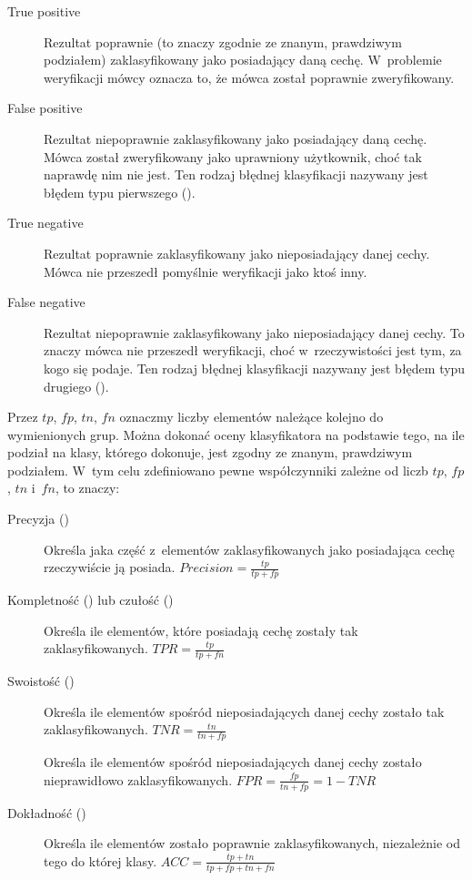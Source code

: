 \begin{description}
    \item[True positive] Rezultat poprawnie (to znaczy zgodnie ze znanym, prawdziwym podziałem) zaklasyfikowany
        jako posiadający daną cechę. W~problemie weryfikacji mówcy oznacza to, że mówca został poprawnie zweryfikowany.
    \item[False positive] Rezultat niepoprawnie zaklasyfikowany jako posiadający daną cechę. Mówca został zweryfikowany
        jako uprawniony użytkownik, choć tak naprawdę nim nie jest. Ten rodzaj błędnej klasyfikacji nazywany jest
        błędem typu pierwszego ().
    \item[True negative] Rezultat poprawnie zaklasyfikowany jako nieposiadający danej cechy. Mówca nie przeszedł pomyślnie
        weryfikacji jako ktoś inny.
    \item[False negative] Rezultat niepoprawnie zaklasyfikowany jako nieposiadający danej cechy. To znaczy mówca nie
        przeszedł weryfikacji, choć w~rzeczywistości jest tym, za kogo się podaje. Ten rodzaj błędnej klasyfikacji nazywany
        jest błędem typu drugiego ().
\end{description}

Przez $tp$, $fp$, $tn$, $fn$ oznaczmy liczby elementów należące kolejno do wymienionych grup.
Można dokonać oceny klasyfikatora na podstawie tego, na ile podział na klasy, którego dokonuje,
jest zgodny ze znanym, prawdziwym podziałem. W~tym celu zdefiniowano pewne współczynniki zależne
od liczb $tp$, $fp$, $tn$ i~$fn$, to znaczy:

\begin{description}
    \item[Precyzja ()] Określa jaka część z~elementów zaklasyfikowanych jako posiadająca cechę rzeczywiście ją posiada. $\mathit{Precision} = \frac{tp}{tp + fp}$
    \item[Kompletność () lub czułość ()]
        Określa ile elementów, które posiadają cechę zostały tak zaklasyfikowanych. $\mathit{TPR} = \frac{tp}{tp + fn}$
    \item[Swoistość ()] Określa ile elementów spośród
        nieposiadających danej cechy zostało tak zaklasyfikowanych. $\mathit{TNR} = \frac{tn}{tn + fp}$
    \item[] Określa ile elementów spośród
        nieposiadających danej cechy zostało nieprawidłowo zaklasyfikowanych. $\mathit{FPR} = \frac{fp}{tn + fp} = 1 - \mathit{TNR}$
    \item[Dokładność ()] Określa ile elementów zostało poprawnie zaklasyfikowanych,
        niezależnie od tego do której klasy. $\mathit{ACC} = \frac{tp + tn}{tp + fp + tn + fn}$
\end{description}

